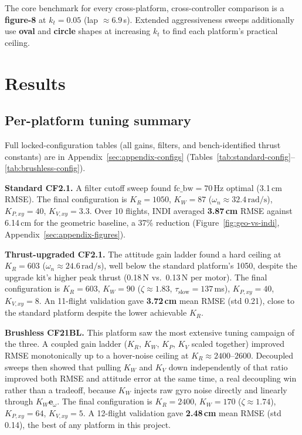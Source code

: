 \documentclass[11pt,a4paper]{article}
\begin{document}
The core benchmark for every cross-platform, cross-controller comparison is a \textbf{figure-8} at
$k_t=0.05$ (lap $\approx6.9$\,s). Extended aggressiveness sweeps additionally use \textbf{oval} and
\textbf{circle} shapes at increasing $k_t$ to find each platform's practical ceiling.

\section{Results}

\subsection{Per-platform tuning summary}

Full locked-configuration tables (all gains, filters, and bench-identified thrust constants) are
in Appendix~\ref{sec:appendix-configs} (Tables~\ref{tab:standard-config}--\ref{tab:brushless-config}).

\textbf{Standard CF2.1.} A filter cutoff sweep found $\mathrm{fc\_bw}=70$\,Hz optimal (3.1\,cm
RMSE). The final configuration is $K_R=1050$, $K_W=87$ ($\omega_n\approx32.4\,\mathrm{rad/s}$),
$K_{P,xy}=40$, $K_{V,xy}=3.3$. Over 10 flights, INDI averaged \textbf{3.87\,cm} RMSE against
6.14\,cm for the geometric baseline, a 37\% reduction (Figure~\ref{fig:geo-vs-indi},
Appendix~\ref{sec:appendix-figures}).

\textbf{Thrust-upgraded CF2.1.} The attitude gain ladder found a hard ceiling at $K_R=603$
($\omega_n\approx24.6\,\mathrm{rad/s}$), well below the standard platform's 1050, despite the
upgrade kit's higher peak thrust (0.18\,N vs.\ 0.13\,N per motor). The final configuration is
$K_R=603$, $K_W=90$ ($\zeta\approx1.83$, $\tau_{\mathrm{slow}}=137$\,ms), $K_{P,xy}=40$,
$K_{V,xy}=8$. An 11-flight validation gave \textbf{3.72\,cm} mean RMSE (std 0.21), close to the
standard platform despite the lower achievable $K_R$.

\textbf{Brushless CF21BL.} This platform saw the most extensive tuning campaign of the three. A
coupled gain ladder ($K_R$, $K_W$, $K_P$, $K_V$ scaled together) improved RMSE monotonically up to
a hover-noise ceiling at $K_R\approx2400$--$2600$. Decoupled sweeps then showed that pulling $K_W$
and $K_V$ down independently of that ratio improved both RMSE and attitude error at the same
time, a real decoupling win rather than a tradeoff, because $K_W$ injects raw gyro noise directly
and linearly through $K_W\mathbf{e}_\omega$. The final configuration is $K_R=2400$, $K_W=170$
($\zeta\approx1.74$), $K_{P,xy}=64$, $K_{V,xy}=5$. A 12-flight validation gave \textbf{2.48\,cm}
mean RMSE (std 0.14), the best of any platform in this project.
\end{document}
